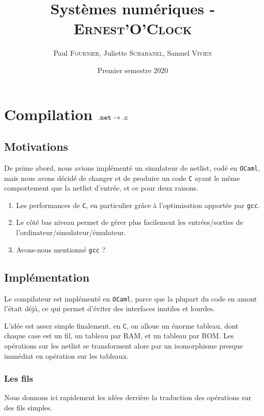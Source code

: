 \documentclass[10pt,a4paper,notitlepage ]{article}
\title{Systèmes numériques - \textsc{Ernest'O'Clock}}
\date{Premier semestre 2020}
\author{Paul \textsc{Fournier}, Juliette \textsc{Schabanel}, Samuel \textsc{Vivien}}
\begin{document}
	\maketitle
	\pagebreak
	\tableofcontents
	\pagebreak
	
	\section{Compilation $\tt{.net} \rightarrow \tt{.c}$}
	
	\subsection{Motivations}
	
	De prime abord, nous avions implémenté un simulateur de netlist, codé en \texttt{OCaml}, mais nous avons décidé de changer et de produire un code \texttt{C} ayant le même comportement que la netlist d'entrée, et ce pour deux raisons.
	\begin{enumerate}
		\item Les performances de \texttt{C}, en particulier grâce à l'optimisation apportée par \texttt{gcc}.
		\item Le côté bas niveau permet de gérer plus facilement les entrées/sorties de l'ordinateur/simulateur/émulateur.
		\item Avons-nous mentionné \texttt{gcc} ?
	\end{enumerate}
	
	\subsection{Implémentation}
	
	Le compilateur est implémenté en \texttt{OCaml}, parce que la plupart du code en amont l'était déjà, ce qui permet d'éviter des interfaces inutiles et lourdes.
	
	L'idée est assez simple finalement, en \texttt{C}, on alloue un énorme tableau, dont chaque case est un fil, un tableau par RAM, et un tableau par ROM. Les opérations sur les netlist se transforment alors par un isomorphisme presque immédiat en opération sur les tableaux.
	
	\subsubsection{Les fils}
	
	Nous donnons ici rapidement les idées derrière la traduction des opérations sur des fils simples.
	
\end{document}
